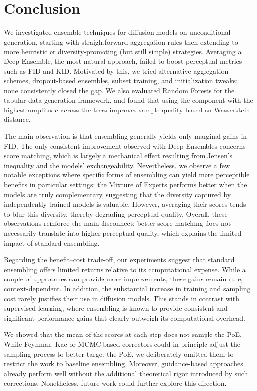\documentclass[10pt]{article} %
\begin{document}
\section{Conclusion}

We investigated ensemble techniques for diffusion models on unconditional generation, starting with straightforward aggregation rules then extending to more heuristic or diversity-promoting (but still simple) strategies. Averaging a Deep Ensemble, the most natural approach, failed to boost perceptual metrics such as FID and KID. Motivated by this, we tried alternative aggregation schemes, dropout-based ensembles, subset training, and initialization tweaks; none consistently closed the gap. We also evaluated Random Forests for the tabular data generation framework, and found that using the component with the highest amplitude across the trees improves sample quality based on Wasserstein distance.


The main observation is that ensembling generally yields only marginal gains in FID. The only consistent improvement observed with Deep Ensembles concerns score matching, which is largely a mechanical effect resulting from Jensen’s inequality and the models’ exchangeability. Nevertheless, we observe a few notable exceptions where specific forms of ensembling can yield more perceptible benefits in particular settings: the Mixture of Experts performs better when the models are truly complementary, suggesting that the diversity captured by independently trained models is valuable. However, averaging their scores tends to blur this diversity, thereby degrading perceptual quality. Overall, these observations reinforce the main disconnect: better score matching does not necessarily translate into higher perceptual quality, which explains the limited impact of standard ensembling.


Regarding the benefit–cost trade-off, our experiments suggest that standard ensembling offers limited returns relative to its computational expense. While a couple of approaches can provide more improvements, these gains remain rare, context-dependent. In addition, the substantial increase in training and sampling cost rarely justifies their use in diffusion models. This stands in contrast with supervised learning, where ensembling is known to provide consistent and significant performance gains \citep{hansen1990neural,lee2015m} that clearly outweigh its computational overhead.


We showed that the mean of the scores at each step does not sample the PoE. While Feynman–Kac \citep{skreta2025feynman} or MCMC-based \citep{du2023reducereuserecyclecompositional} correctors could in principle adjust the sampling process to better target the PoE, we deliberately omitted them to restrict the work to baseline ensembling. Moreover, guidance-based approaches already perform well without the additional theoretical rigor introduced by such corrections. Nonetheless, future work could further explore this direction.
\end{document}
